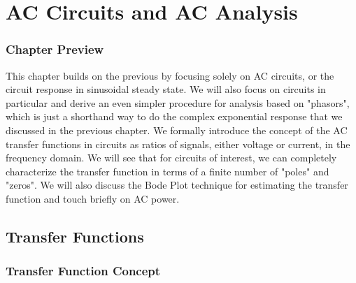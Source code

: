 

\chapter{AC Circuits and AC Analysis}

\graphicspath{{./figs_AC/}}




\subsection{Chapter Preview}

This chapter builds on the previous by focusing solely on AC circuits, or the circuit response in sinusoidal steady state.  We will also focus on circuits in particular and derive an even simpler procedure for analysis based on "phasors", which is just a shorthand way to do the complex exponential response that we discussed in the previous chapter.  We formally introduce the concept of the AC transfer functions in circuits as ratios of signals, either voltage or current, in the frequency domain.  We will see that for circuits of interest, we can completely characterize the transfer function in terms of a finite number of "poles" and "zeros".     We will also discuss the Bode Plot technique for estimating the transfer function and touch briefly on AC power.

 

\section{Transfer Functions}







\subsection{Transfer Function Concept}

